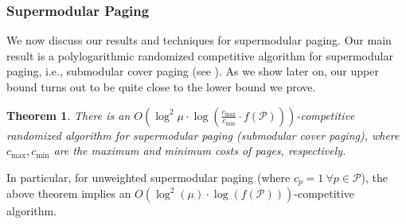 \documentclass[11pt]{article}
\newcommand{\cP}{{\mathcal{P}}}
\newtheorem{cor}[thm]{Corollary}
\newtheorem{theorem}[thm]{Theorem}
\begin{document}
%
%
%

\subsubsection{Supermodular Paging} %

We now discuss our results and techniques for supermodular paging. Our main result is a polylogarithmic randomized competitive algorithm for supermodular paging, i.e., submodular cover paging (see ). %
As we show later on, our upper bound turns out to be quite close to the lower bound we prove. 


	\begin{theorem}
	\label{thm:randomized}
There is an $O\left(\log^2 \mu \cdot \log \left(\frac{c_{\max}}{c_{\min}} \cdot f(\cP) \right)\right)$-competitive randomized algorithm for \textnormal{supermodular paging (submodular cover paging)}, where $c_{\max},c_{\min}$ are the maximum and minimum costs of pages, respectively.
\end{theorem}
In particular, for unweighted supermodular paging (where $c_p = 1~\forall p \in \cP$), the above theorem implies an $O\left(\log^2 (\mu) \cdot \log \left(f(\cP) \right)\right)$-competitive algorithm.
\end{document}
